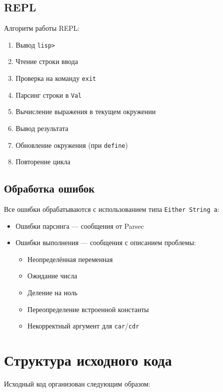 \documentclass[a4paper,12pt]{article}
\begin{document}
\subsection{REPL}

Алгоритм работы REPL:
\begin{enumerate}
    \item Вывод \texttt{lisp>}
    \item Чтение строки ввода
    \item Проверка на команду \texttt{exit}
    \item Парсинг строки в \texttt{Val}
    \item Вычисление выражения в текущем окружении
    \item Вывод результата
    \item Обновление окружения (при \texttt{define})
    \item Повторение цикла
\end{enumerate}

\subsection{Обработка ошибок}
Все ошибки обрабатываются с использованием типа \texttt{Either String a}:
\begin{itemize}
    \item Ошибки парсинга — сообщения от Parsec
    \item Ошибки выполнения — сообщения с описанием проблемы:
    \begin{itemize}
        \item Неопределённая переменная
        \item Ожидание числа
        \item Деление на ноль
        \item Переопределение встроенной константы
        \item Некорректный аргумент для \texttt{car}/\texttt{cdr}
    \end{itemize}
\end{itemize}

\section{Структура исходного кода}

Исходный код организован следующим образом:
\end{document}
